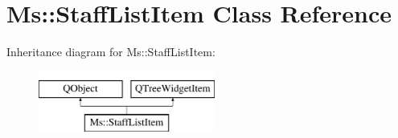 \hypertarget{class_ms_1_1_staff_list_item}{}\section{Ms\+:\+:Staff\+List\+Item Class Reference}
\label{class_ms_1_1_staff_list_item}
Inheritance diagram for Ms\+:\+:Staff\+List\+Item\+:\begin{figure}[H]
\begin{center}
\leavevmode
\includegraphics[height=2.000000cm]{class_ms_1_1_staff_list_item}
\end{center}
\end{figure}
